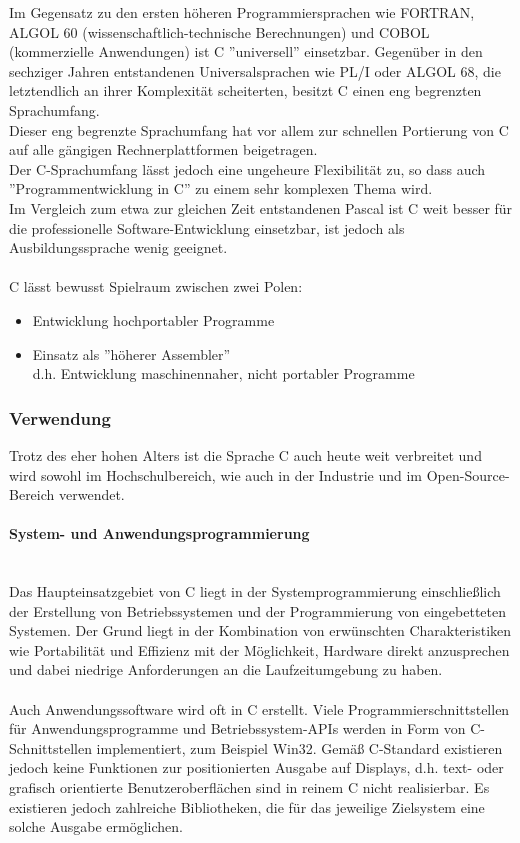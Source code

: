 Im Gegensatz zu den ersten höheren Programmiersprachen wie FORTRAN, ALGOL 60 (wissenschaftlich-technische Berechnungen) und COBOL (kommerzielle Anwendungen) ist C ''universell'' einsetzbar. Gegenüber in den sechziger Jahren entstandenen Universalsprachen wie PL/I oder ALGOL 68, die letztendlich an ihrer Komplexität scheiterten, besitzt C einen eng begrenzten Sprachumfang.\\
Dieser eng begrenzte Sprachumfang hat vor allem zur schnellen Portierung von C auf alle gängigen Rechnerplattformen beigetragen.\\
Der C-Sprachumfang lässt jedoch eine ungeheure Flexibilität zu, so dass auch ''Programmentwicklung in C'' zu einem sehr komplexen Thema wird.\\
Im Vergleich zum etwa zur gleichen Zeit entstandenen Pascal ist C weit besser für die professionelle Software-Entwicklung einsetzbar, ist jedoch als Ausbildungssprache wenig geeignet.\\
\\
C lässt bewusst Spielraum zwischen zwei Polen:
\begin{itemize}
\item Entwicklung hochportabler Programme
\item Einsatz als ''höherer Assembler''\\
d.h. Entwicklung maschinennaher, nicht portabler Programme 
\end{itemize}

\subsubsection{Verwendung}
Trotz des eher hohen Alters ist die Sprache C auch heute weit verbreitet und wird sowohl im Hochschulbereich, wie auch in der Industrie und im Open-Source-Bereich verwendet.
\paragraph{System- und Anwendungsprogrammierung}
\ \\
Das Haupteinsatzgebiet von C liegt in der Systemprogrammierung einschließlich der Erstellung von Betriebssystemen und der Programmierung von eingebetteten Systemen. Der Grund liegt in der Kombination von erwünschten Charakteristiken wie Portabilität und Effizienz mit der Möglichkeit, Hardware direkt anzusprechen und dabei niedrige Anforderungen an die Laufzeitumgebung zu haben.\\
\\
Auch Anwendungssoftware wird oft in C erstellt. Viele Programmierschnittstellen für Anwendungsprogramme und Betriebssystem-APIs werden in Form von C-Schnittstellen implementiert, zum Beispiel Win32. Gemäß C-Standard existieren jedoch keine Funktionen zur positionierten Ausgabe auf Displays, d.h. text- oder grafisch orientierte Benutzeroberflächen sind in reinem C nicht realisierbar. Es existieren jedoch zahlreiche Bibliotheken, die für das jeweilige Zielsystem eine solche Ausgabe ermöglichen.\\

